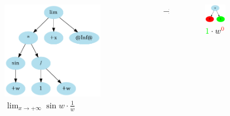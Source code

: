 \documentclass[aspectratio=149]{beamer}
\begin{document}
	\begin{frame}
		\begin{columns}
			\begin{column}{0.45\textwidth}
				\begin{figure}
					\includegraphics[width=0.8\textwidth]{pres_img/rewritten.png}
					\caption{\(\lim_{x \to +\infty}{\sin{w} \cdot \frac{1}{w}}\)}
				\end{figure}
			\end{column}
			\begin{column}{0.1\textwidth}
				\begin{center}
					$\rightarrow$
				\end{center}
			\end{column}
			\begin{column}{0.45\textwidth}
				\begin{figure}
					\includegraphics[width=0.4\textwidth]{pres_img/series.png}
					\caption{\(\textcolor{green}{1} \cdot w^{\textcolor{red}{0}}\)}
				\end{figure}
			\end{column}
		\end{columns}
	\end{frame}
\end{document}
